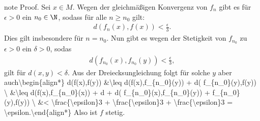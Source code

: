 \documentclass[letterpaper,10pt,english]{jupyterBook}
\begin{document}
\begin{sphinxadmonition}{note}
Proof.  Sei \(x \in M\). Wegen der gleichmäßigen Konvergenz von \(f_n\) gibt es für \(\epsilon > 0\) ein \(n_0 \in \N\), sodass für alle \(n \geq n_0\) gilt:
\begin{equation*}
\begin{split} d(f_n(x),f(x)) < \frac{\epsilon}3.\end{split}
\end{equation*}
Dies gilt insbesondere für \(n=n_0\). Nun gibt es wegen der Stetigkeit von \(f_{n_0}\) zu \(\epsilon > 0\) ein \(\delta > 0\), sodas
\begin{equation*}
\begin{split} d(f_{n_0}(x),f_{n_0}(y)) < \frac{\epsilon}3,\end{split}
\end{equation*}
gilt für \(d(x,y) < \delta\). Aus der Dreiecksungleichung folgt für solche \(y\) aber auch\textbackslash{}begin\{align*\} d(f(x),f(y)) \&\textbackslash{}leq d(f(x),f\_\{n\_0\}(y)) + d( f\_\{n\_0\}(y),f(y)) \textbackslash{} \&\textbackslash{}leq d(f(x),f\_\{n\_0\}(x)) + d + d( f\_\{n\_0\}(x),f\_\{n\_0\}(y)) + f\_\{n\_0\}(y),f(y)) \textbackslash{} \&< \textbackslash{}frac\{\textbackslash{}epsilon\}3 + \textbackslash{}frac\{\textbackslash{}epsilon\}3 + \textbackslash{}frac\{\textbackslash{}epsilon\}3 = \textbackslash{}epsilon.\textbackslash{}end\{align*\}
Also ist \(f\) stetig.
\end{sphinxadmonition}
\end{document}
